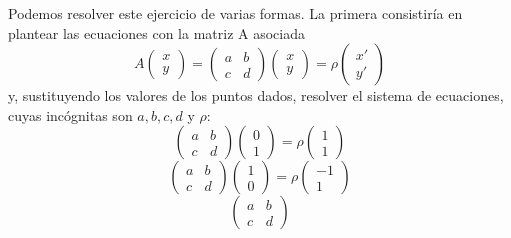 \begin{exa}
	Podemos resolver este ejercicio de varias formas. La primera consistiría en plantear las ecuaciones con la matriz A asociada
	\begin{equation*}
		A\left( \begin{array}{c}
			x\\ y
		\end{array}\right)
		=\left( \begin{array}{cc}
			a&b\\ c&d
		\end{array}\right) 
		\left( \begin{array}{c}
			x\\ y
		\end{array}\right)=\rho
		\left( \begin{array}{c}
		x'\\ y'
	\end{array}\right)
	\end{equation*}
	y, sustituyendo los valores de los puntos dados, resolver el sistema de ecuaciones, cuyas incógnitas son $a,b,c,d$ y $\rho$:
	\begin{equation*}
		\left( \begin{array}{cc}
			a&b\\ c&d
		\end{array}\right) 
		\left( \begin{array}{c}
			0\\ 1
		\end{array}\right)=\rho
		\left( \begin{array}{c}
			1\\ 1
		\end{array}\right)
	\end{equation*}
	\begin{equation*}
		\left( \begin{array}{cc}
			a&b\\ c&d
		\end{array}\right) 
		\left( \begin{array}{c}
			1\\ 0
		\end{array}\right)=\rho
		\left( \begin{array}{c}
			-1\\ 1
		\end{array}\right)
	\end{equation*}
	\begin{equation*}
		\left( \begin{array}{cc}
			a&b\\ c&d
		\end{array}\right) 

\end{equation*}
\end{exa}
